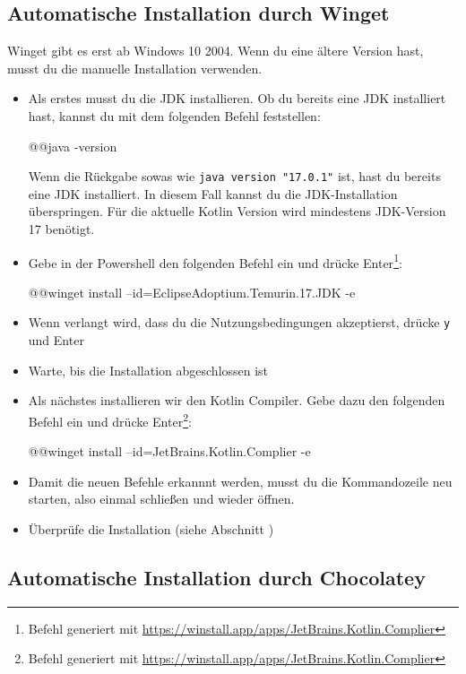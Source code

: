 \subsection*{Automatische Installation durch Winget}
\begin{hinweis}
    Winget gibt es erst ab Windows 10 2004. Wenn du eine ältere Version hast, musst du die manuelle Installation verwenden.
\end{hinweis}
\begin{itemize}
    \item Als erstes musst du die JDK installieren. Ob du bereits eine JDK installiert hast, kannst du mit dem folgenden Befehl feststellen:
        \begin{commandshell}
            @\shellprefix{}@java -version
        \end{commandshell}
        Wenn die Rückgabe sowas wie \verb+java version "17.0.1"+ ist, hast du bereits eine JDK installiert. In diesem Fall kannst du die JDK-Installation überspringen. Für die aktuelle Kotlin Version wird mindestens JDK-Version 17 benötigt.
    \item Gebe in der Powershell den folgenden Befehl ein und drücke Enter\footnote{Befehl generiert mit \url{https://winstall.app/apps/JetBrains.Kotlin.Complier}}:
        \begin{commandshell}
            @\shellprefix{}@winget install --id=EclipseAdoptium.Temurin.17.JDK -e
        \end{commandshell}
    \item Wenn verlangt wird, dass du die Nutzungsbedingungen akzeptierst, drücke \texttt{y} und Enter
    \item Warte, bis die Installation abgeschlossen ist
    \item Als nächstes installieren wir den Kotlin Compiler. Gebe dazu den folgenden Befehl ein und drücke Enter\footnote{Befehl generiert mit \url{https://winstall.app/apps/JetBrains.Kotlin.Complier}}:
        \begin{commandshell}
            @\shellprefix{}@winget install --id=JetBrains.Kotlin.Complier -e
        \end{commandshell}
    \item Damit die neuen Befehle erkannnt werden, musst du die Kommandozeile neu starten, also einmal schließen und wieder öffnen.
    \item Überprüfe die Installation (siehe Abschnitt )
\end{itemize}
\subsection*{Automatische Installation durch Chocolatey}
